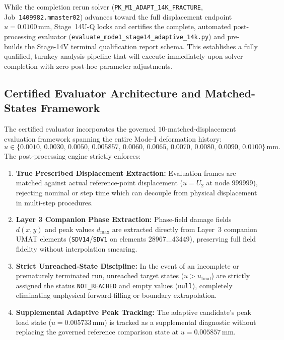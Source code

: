 While the completion rerun solver (\texttt{PK\_M1\_ADAPT\_14K\_FRACTURE}, Job~\texttt{1409982.mmaster02}) advances toward the full displacement endpoint $u = 0.0100\,\mathrm{mm}$, Stage~14U-Q locks and certifies the complete, automated post-processing evaluator (\texttt{evaluate\_mode1\_stage14\_adaptive\_14k.py}) and pre-builds the Stage-14V terminal qualification report schema. This establishes a fully qualified, turnkey analysis pipeline that will execute immediately upon solver completion with zero post-hoc parameter adjustments.

\subsection{Certified Evaluator Architecture and Matched-States Framework}
\label{subsec:stage14uq_evaluator_architecture}

The certified evaluator incorporates the governed $10$-matched-displacement evaluation framework spanning the entire Mode-I deformation history:
\begin{equation}
u \in \{0.0010, \, 0.0030, \, 0.0050, \, 0.005857, \, 0.0060, \, 0.0065, \, 0.0070, \, 0.0080, \, 0.0090, \, 0.0100\}\,\mathrm{mm}.
\end{equation}
The post-processing engine strictly enforces:
\begin{enumerate}
    \item \textbf{True Prescribed Displacement Extraction:} Evaluation frames are matched against actual reference-point displacement ($u = U_2$ at node $999999$), rejecting nominal or step time which can decouple from physical displacement in multi-step procedures.
    \item \textbf{Layer 3 Companion Phase Extraction:} Phase-field damage fields $d(x,y)$ and peak values $d_{\max}$ are extracted directly from Layer~3 companion UMAT elements (\texttt{SDV14}/\texttt{SDV1} on elements $28967\dots43449$), preserving full field fidelity without interpolation smearing.
    \item \textbf{Strict Unreached-State Discipline:} In the event of an incomplete or prematurely terminated run, unreached target states ($u > u_{\mathrm{final}}$) are strictly assigned the status \texttt{NOT\_REACHED} and empty values (\texttt{null}), completely eliminating unphysical forward-filling or boundary extrapolation.
    \item \textbf{Supplemental Adaptive Peak Tracking:} The adaptive candidate's peak load state ($u = 0.005733\,\mathrm{mm}$) is tracked as a supplemental diagnostic without replacing the governed reference comparison state at $u = 0.005857\,\mathrm{mm}$.
\end{enumerate}


